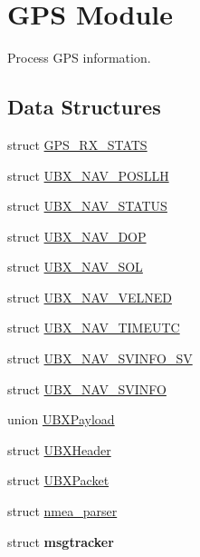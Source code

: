 \hypertarget{group___g_s_p_module}{\section{\-G\-P\-S \-Module}
\label{group___g_s_p_module}
}


\-Process \-G\-P\-S information.  


\subsection*{\-Data \-Structures}
\begin{DoxyCompactItemize}
\item 
struct \hyperlink{struct_g_p_s___r_x___s_t_a_t_s}{\-G\-P\-S\-\_\-\-R\-X\-\_\-\-S\-T\-A\-T\-S}
\item 
struct \hyperlink{struct_u_b_x___n_a_v___p_o_s_l_l_h}{\-U\-B\-X\-\_\-\-N\-A\-V\-\_\-\-P\-O\-S\-L\-L\-H}
\item 
struct \hyperlink{struct_u_b_x___n_a_v___s_t_a_t_u_s}{\-U\-B\-X\-\_\-\-N\-A\-V\-\_\-\-S\-T\-A\-T\-U\-S}
\item 
struct \hyperlink{struct_u_b_x___n_a_v___d_o_p}{\-U\-B\-X\-\_\-\-N\-A\-V\-\_\-\-D\-O\-P}
\item 
struct \hyperlink{struct_u_b_x___n_a_v___s_o_l}{\-U\-B\-X\-\_\-\-N\-A\-V\-\_\-\-S\-O\-L}
\item 
struct \hyperlink{struct_u_b_x___n_a_v___v_e_l_n_e_d}{\-U\-B\-X\-\_\-\-N\-A\-V\-\_\-\-V\-E\-L\-N\-E\-D}
\item 
struct \hyperlink{struct_u_b_x___n_a_v___t_i_m_e_u_t_c}{\-U\-B\-X\-\_\-\-N\-A\-V\-\_\-\-T\-I\-M\-E\-U\-T\-C}
\item 
struct \hyperlink{struct_u_b_x___n_a_v___s_v_i_n_f_o___s_v}{\-U\-B\-X\-\_\-\-N\-A\-V\-\_\-\-S\-V\-I\-N\-F\-O\-\_\-\-S\-V}
\item 
struct \hyperlink{struct_u_b_x___n_a_v___s_v_i_n_f_o}{\-U\-B\-X\-\_\-\-N\-A\-V\-\_\-\-S\-V\-I\-N\-F\-O}
\item 
union \hyperlink{union_u_b_x_payload}{\-U\-B\-X\-Payload}
\item 
struct \hyperlink{struct_u_b_x_header}{\-U\-B\-X\-Header}
\item 
struct \hyperlink{struct_u_b_x_packet}{\-U\-B\-X\-Packet}
\item 
struct \hyperlink{structnmea__parser}{nmea\-\_\-parser}
\item 
struct {\bfseries msgtracker}
\end{DoxyCompactItemize}
